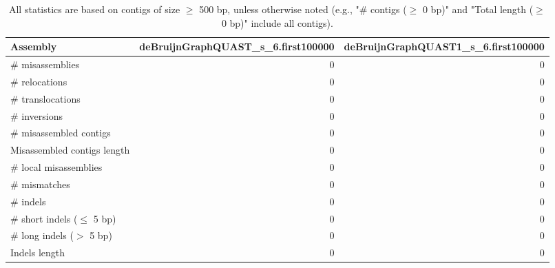 \documentclass[12pt,a4paper]{article}
\begin{document}
\begin{table}[ht]
\begin{center}
\caption{All statistics are based on contigs of size $\geq$ 500 bp, unless otherwise noted (e.g., "\# contigs ($\geq$ 0 bp)" and "Total length ($\geq$ 0 bp)" include all contigs).}
\begin{tabular}{|l*{2}{|r}|}
\hline
Assembly & deBruijnGraphQUAST\_s\_6.first100000 & deBruijnGraphQUAST1\_s\_6.first100000 \\ \hline
\# misassemblies & 0 & 0 \\ \hline
\hspace{5mm}\# relocations & 0 & 0 \\ \hline
\hspace{5mm}\# translocations & 0 & 0 \\ \hline
\hspace{5mm}\# inversions & 0 & 0 \\ \hline
\# misassembled contigs & 0 & 0 \\ \hline
Misassembled contigs length & 0 & 0 \\ \hline
\# local misassemblies & 0 & 0 \\ \hline
\# mismatches & 0 & 0 \\ \hline
\# indels & 0 & 0 \\ \hline
\hspace{5mm}\# short indels ($\leq$ 5 bp) & 0 & 0 \\ \hline
\hspace{5mm}\# long indels ($>$ 5 bp) & 0 & 0 \\ \hline
Indels length & 0 & 0 \\ \hline
\end{tabular}
\end{center}
\end{table}
\end{document}
